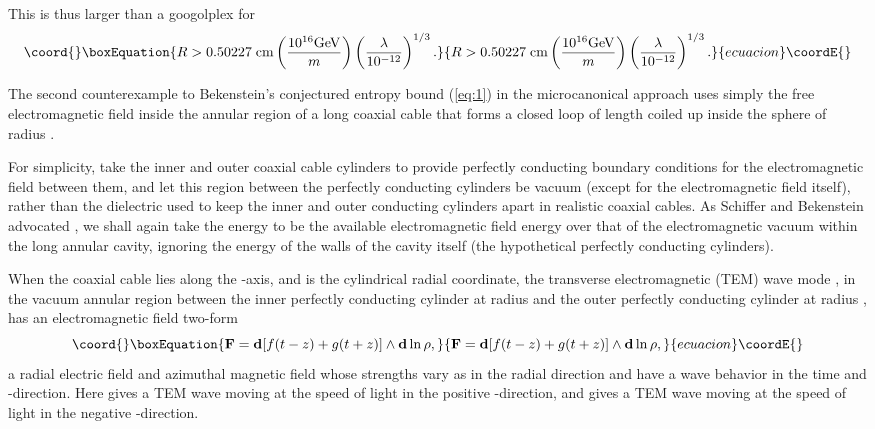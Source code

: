 \documentclass[a4paper,12pt]{article}
\begin{document}
This is thus larger than a googolplex for
 \begin{equation}\coord{}\boxEquation{
 R > 0.50227 \; {\rm cm}\left({10^{16}{\rm GeV}\over m}\right)
     \left({\lambda\over 10^{-12}}\right)^{1/3}.
 \label{eq:13}
 }{
 R > 0.50227 \; {\rm cm}\left({10^{16}{\rm GeV}\over m}\right)
     \left({\lambda\over 10^{-12}}\right)^{1/3}.
 }{ecuacion}\coordE{}\end{equation}

	The second counterexample to Bekenstein's
conjectured entropy bound (\ref{eq:1}) in the microcanonical
approach uses simply the free electromagnetic field
inside the annular region of a long coaxial cable
that forms a closed loop of length \coordHE{}
coiled up inside the sphere of radius \coordHE{}.

	For simplicity, take the inner and outer coaxial
cable cylinders to provide perfectly conducting
boundary conditions for the electromagnetic field
between them, and let this region between
the perfectly conducting cylinders be vacuum
(except for the electromagnetic field itself),
rather than the dielectric used
to keep the inner and outer conducting cylinders apart
in realistic coaxial cables.
As Schiffer and Bekenstein advocated
\cite{SB1},
we shall again take the energy \coordHE{} to be the available
electromagnetic field energy over that
of the electromagnetic vacuum within the long annular cavity,
ignoring the energy of the walls of the cavity itself
(the hypothetical perfectly conducting cylinders).

	When the coaxial cable lies along the \coordHE{}-axis,
and \coordHE{}
is the cylindrical radial coordinate,
the transverse electromagnetic (TEM) wave mode
\cite{Jackson75},
in the vacuum annular region \coordHE{}
between the inner perfectly conducting cylinder
at radius \coordHE{}
and the outer perfectly conducting cylinder
at radius \coordHE{},
has an electromagnetic field two-form
 \begin{equation}\coord{}\boxEquation{
 \mathbf{F} = \mathbf{d}[f(t-z)+g(t+z)]
 \wedge \mathbf{d}\ln{\rho},
 \label{eq:14}
 }{
 \mathbf{F} = \mathbf{d}[f(t-z)+g(t+z)]
 \wedge \mathbf{d}\ln{\rho},
 }{ecuacion}\coordE{}\end{equation}
a radial electric field and azimuthal magnetic field
whose strengths vary as \coordHE{} in the radial direction
and have a wave behavior in the time and \coordHE{}-direction.
Here \coordHE{} gives a TEM wave moving at the speed of light
in the positive \coordHE{}-direction, and \coordHE{} gives
a TEM wave moving at the speed of light in the
negative \coordHE{}-direction.
\end{document}
